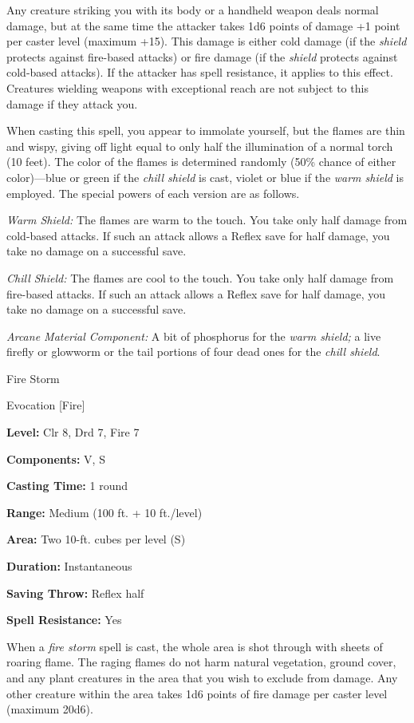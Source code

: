 \documentclass{article}
\begin{document}
Any creature striking you with its body or a handheld weapon deals normal damage, 
but at the same time the attacker takes 1d6 points of damage +1 point per caster 
level (maximum +15). This damage is either cold damage (if the \textit{shield }protects 
against fire-based attacks) or fire damage (if the \textit{shield }protects against 
cold-based attacks). If the attacker has spell resistance, it applies to this effect. 
Creatures wielding weapons with exceptional reach are not subject to this damage 
if they attack you.

When casting this spell, you appear to immolate yourself, but the flames are thin 
and wispy, giving off light equal to only half the illumination of a normal torch 
(10 feet). The color of the flames is determined randomly (50\% chance of either 
color)---blue or green if the \textit{chill shield }is cast, violet or blue if 
the \textit{warm shield }is employed. The special powers of each version are as 
follows.

\textit{Warm Shield: }The flames are warm to the touch. You take only half damage 
from cold-based attacks. If such an attack allows a Reflex save for half damage, 
you take no damage on a successful save.

\textit{Chill Shield: }The flames are cool to the touch. You take only half damage 
from fire-based attacks. If such an attack allows a Reflex save for half damage, 
you take no damage on a successful save.

\textit{Arcane Material Component: }A bit of phosphorus for the \textit{warm shield; 
}a live firefly or glowworm or the tail portions of four dead ones for the \textit{chill 
shield}.

\vspace{12pt}
Fire Storm

Evocation [Fire]

\textbf{Level:} Clr 8, Drd 7, Fire 7

\textbf{Components:} V, S

\textbf{Casting Time:} 1 round

\textbf{Range: }Medium (100 ft. + 10 ft./level)

\textbf{Area:} Two 10-ft. cubes per level (S)

\textbf{Duration:} Instantaneous

\textbf{Saving Throw:} Reflex half

\textbf{Spell Resistance:} Yes

When a \textit{fire storm }spell is cast, the whole area is shot through with sheets 
of roaring flame. The raging flames do not harm natural vegetation, ground cover, 
and any plant creatures in the area that you wish to exclude from damage. Any other 
creature within the area takes 1d6 points of fire damage per caster level (maximum 
20d6).
\end{document}
